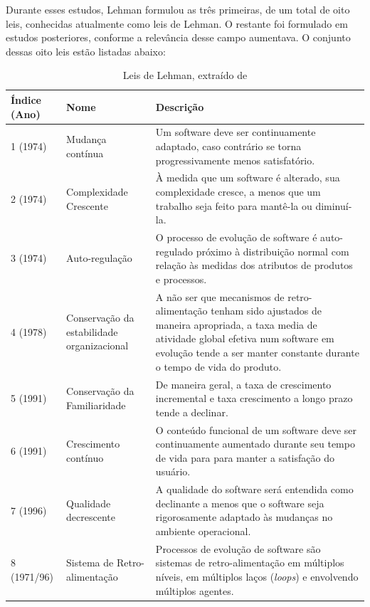 Durante esses estudos, Lehman formulou as três primeiras, de um total de oito leis, conhecidas atualmente como leis de Lehman. O restante foi formulado em estudos posteriores, conforme a relevância desse campo aumentava. O conjunto dessas oito leis estão listadas abaixo:
\begin{table}[h]
\begin{center}
    \begin{tabular}{ | l | p{4cm} | p{9cm} |}
    \hline
    Índice (Ano) & Nome & Descrição \\ \hline
    1 (1974) & Mudança contínua & Um software deve ser continuamente adaptado, caso contrário se torna progressivamente menos satisfatório. \\ \hline
    2 (1974) & Complexidade Crescente & À medida que um software é alterado, sua complexidade cresce, a menos que um trabalho seja feito para mantê-la ou diminuí-la. \\ \hline
    3 (1974) & Auto-regulação & O processo de evolução de software é auto-regulado próximo à distribuição normal com relação às medidas dos atributos de produtos e processos. \\ \hline
    4 (1978) & Conservação da estabilidade organizacional & A não ser que mecanismos de retro-alimentação tenham sido ajustados de maneira apropriada, a taxa media de atividade global efetiva num software em evolução tende a ser manter constante durante o tempo de vida do produto. \\ \hline
    5 (1991) & Conservação da Familiaridade & De maneira geral, a taxa de crescimento incremental e taxa crescimento a longo prazo tende a declinar. \\ \hline
    6 (1991) & Crescimento contínuo & O conteúdo funcional de um software deve ser continuamente aumentado durante seu tempo de vida para para manter a satisfação do usuário. \\ \hline
    7 (1996) & Qualidade decrescente & A qualidade do software será entendida como declinante a menos que o software seja rigorosamente adaptado às mudanças no ambiente operacional. \\ \hline
    8 (1971/96) & Sistema de Retro-alimentação & Processos de evolução de software são sistemas de retro-alimentação em múltiplos níveis, em múltiplos laços (\textit{loops}) e envolvendo múltiplos agentes. \\ \hline
    \end{tabular}
    \caption{Leis de Lehman, extraído de \cite{fernandez2008empirical}}
    \label{tab-leis-lehman}
\end{center}
\end{table}

